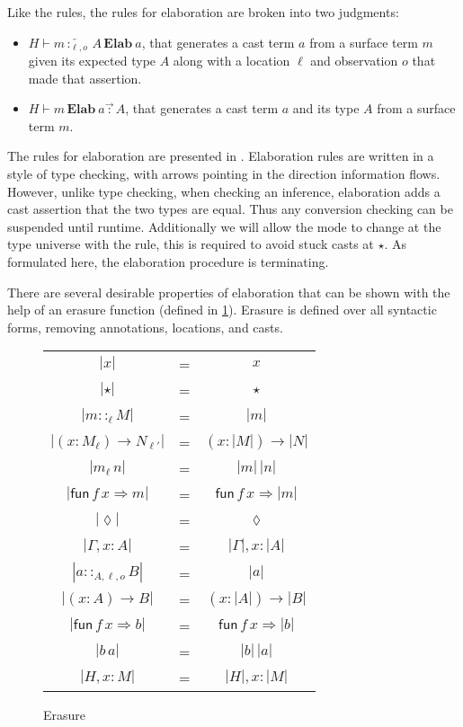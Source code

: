 Like the \bidir{} rules, the rules for elaboration are broken into two judgments:
\begin{itemize}
\item $H\vdash m\overleftarrow{\,:_{\ell,o}\,}A\,\textbf{Elab}\ a$, that generates a cast term $a$ from a surface term $m$ given its expected type $A$ along with a location $\ell$ and observation $o$ that made that assertion.
\item $H\vdash m\,\textbf{Elab}\ a\overrightarrow{\,:\,}A$, that generates a cast term $a$ and its type $A$ from a surface term $m$.
\end{itemize}
The rules for elaboration are presented in .
Elaboration rules are written in a style of \bidir{} type checking, with arrows pointing in the direction information flows.
However, unlike \bidir{} type checking, when checking an inference, elaboration adds a cast assertion that the two types are equal.
Thus any conversion checking can be suspended until runtime.
Additionally we will allow the mode to change at the type universe with the  rule, this is required to avoid stuck casts at $\star$.
As formulated here, the elaboration procedure is terminating.

There are several desirable properties of elaboration that can be shown with the help of an erasure function (defined in \ref{fig:erasure}).
Erasure is defined over all syntactic forms, removing annotations, locations, and casts.

\begin{figure}
\begin{tabular}{ccc}
$|x|$ & = & $x$\tabularnewline
$|\star|$ & = & $\star$\tabularnewline
$|m::_{\ell}M|$ & = & $|m|$\tabularnewline
$|\left(x:M_{\ell}\right)\rightarrow N_{\ell'}|$ & = & $\left(x:|M|\right)\rightarrow|N|$\tabularnewline
$|m_{\ell}\,n|$ & = & $|m|\,|n|$\tabularnewline
$|\mathsf{fun}\,f\,x\Rightarrow m|$ & = & $\mathsf{fun}\,f\,x\Rightarrow|m|$\tabularnewline
$|\lozenge|$ & = & $\lozenge$\tabularnewline
$|\Gamma,x:A|$ & = & $|\Gamma|,x:|A|$\tabularnewline
$|a::_{A,\ell,o}B|$ & = & $|a|$\tabularnewline
$|\left(x:A\right)\rightarrow B|$ & = & $\left(x:|A|\right)\rightarrow|B|$\tabularnewline
$|\mathsf{fun}\,f\,x\Rightarrow b|$ & = & $\mathsf{fun}\,f\,x\Rightarrow|b|$\tabularnewline
$|b\,a|$ & = & $|b|\,|a|$\tabularnewline
$|H,x:M|$ & = & $|H|,x:|M|$\tabularnewline
\end{tabular}
\caption{Erasure}
\label{fig:erasure}
\end{figure}

